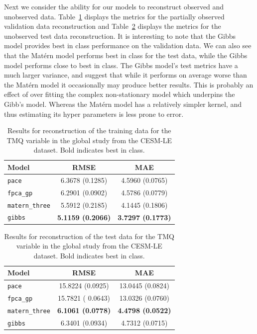 Next we consider the ability for our models to reconstruct observed and unobserved data. 
Table~\ref{tab:train_cesm_tmq_globe} displays the metrics for the partially observed validation data reconstruction and Table~\ref{tab:test_cesm_tmq_globe} displays the metrics for the unobserved test data reconstruction.
It is interesting to note that the Gibbs model provides best in class performance on the  validation data.
We can also see that the Mat\'ern model performs best in class for the test data, while the Gibbs model performs close to best in class.
The Gibbs model's test metrics have a much larger variance, and suggest that while it performs on average worse than the Mat\'ern model it occasionally may produce better results.
This is probably an effect of over fitting the complex non-stationary model which underpins the Gibb's model.
Whereas the Mat\'ern model has a relatively simpler kernel, and thus estimating its hyper parameters is less prone to error.

\begin{table}
	\caption[Results for TMQ variable on training data in the Global study]{Results for reconstruction of the training data for the TMQ variable in the global study from the CESM-LE dataset. Bold indicates best in class.}
	\centering
	\label{tab:train_cesm_tmq_globe}
	\begin{tabular}{lcc}
		\toprule
		\textbf{Model} & \textbf{RMSE} & \textbf{MAE} \\
		\midrule
		\verb*|pace| & 6.3678 (0.1285) & 4.5960 (0.0765) \\
		\verb*|fpca_gp| & 6.2901	(0.0902) & 4.5786 (0.0779) \\
		\verb*|matern_three| & 5.5912 (0.2185)& 4.1445 (0.1806)\\
		\verb*|gibbs| & \textbf{5.1159 (0.2066)} & \textbf{3.7297 (0.1773)}\\
		\bottomrule
	\end{tabular}
\end{table}

\begin{table}
	\caption[Results for TMQ variable on test data in the Global study]{Results for reconstruction of the test data for the TMQ variable in the global study from the CESM-LE dataset. Bold indicates best in class.}
	\centering
	\label{tab:test_cesm_tmq_globe}
	\begin{tabular}{lcc}
		\toprule
		\textbf{Model} & \textbf{RMSE} & \textbf{MAE} \\
		\midrule
		\verb*|pace| & 15.8224 (0.0925) & 13.0445 (0.0824) \\
		\verb*|fpca_gp| & 15.7821 (	0.0643) & 13.0326 (0.0760) \\
		\verb*|matern_three| & \textbf{6.1061 (0.0778)}& \textbf{4.4798 (0.0522)}\\
		\verb*|gibbs| & 6.3401 (0.0934) & 4.7312 (0.0715)\\
		\bottomrule
	\end{tabular}
\end{table}

